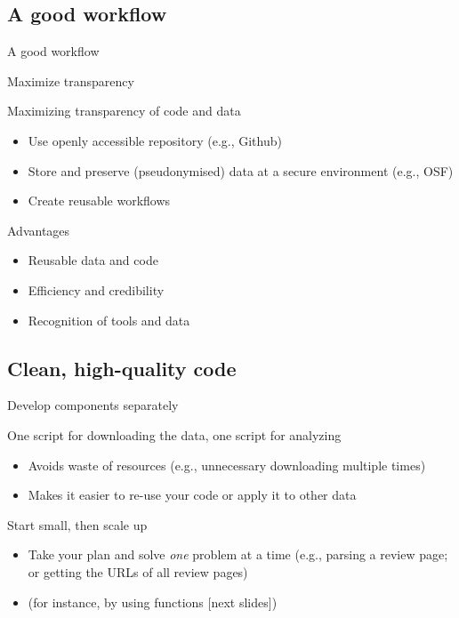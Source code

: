 \documentclass[compress]{beamer}
\begin{document}
\subsection{A good workflow}
\begin{frame}
	A good workflow
\end{frame}


\begin{frame}{Maximize transparency}
\begin{block}{Maximizing transparency of code and data}
	\begin{itemize}[<+->]
		\item Use openly accessible repository (e.g., Github)
		\item Store and preserve (pseudonymised) data at a secure environment (e.g., OSF)
		\item Create reusable workflows 
	\end{itemize}
\end{block}
\pause
\begin{exampleblock}{Advantages}
	\begin{itemize}[<+->]
		\item Reusable data and code
		\item Efficiency and credibility 
		\item Recognition of tools and data
	\end{itemize}
\end{exampleblock}

\end{frame}	

\subsection{Clean, high-quality code}
\begin{frame}{Develop components separately}
	\begin{block}{One script for downloading the data, one script for analyzing}
		\begin{itemize}[<+->]
			\item Avoids waste of resources (e.g., unnecessary downloading multiple times)
			\item Makes it easier to re-use your code or apply it to other data
		\end{itemize}
	\end{block}
\pause
\begin{block}{Start small, then scale up}
	\begin{itemize}[<+->]
		\item Take your plan and solve \textit{one} problem at a time (e.g., parsing a review page; or getting the URLs of all review pages)
		\item (for instance, by using functions [next slides])
	\end{itemize}
\end{block}

\end{frame}	
\end{document}
